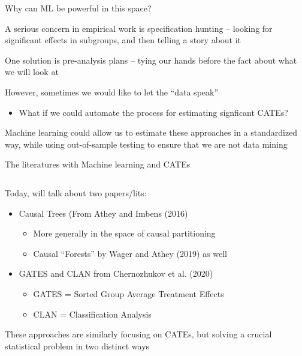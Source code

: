 \documentclass[notes,11pt, aspectratio=169]{beamer}
\newenvironment{wideitemize}{\itemize\addtolength{\itemsep}{10pt}}{\enditemize}
\begin{document}
\begin{frame}{Why can ML be powerful in this space?}
  \begin{wideitemize}
  \item A serious concern in empirical work is specification hunting
    -- looking for significant effects in subgroups, and then telling
    a story about it
  \item One solution is pre-analysis plans -- tying our hands before
    the fact about what we will look at
  \item However, sometimes we would like to let the ``data speak''
    \begin{itemize}
    \item What if we could automate the process for estimating signficant CATEs?
    \end{itemize}
  \item Machine learning could allow us to estimate these approaches
    in a standardized way, while using out-of-sample testing to ensure
    that we are not data mining
  \end{wideitemize}
\end{frame}

\begin{frame}{The literatures with Machine learning and CATEs}
    \begin{columns}[onlytextwidth, T] %
      \begin{column}{.9\textwidth}
        \begin{wideitemize}
        \item Today, will talk about two papers/lits:
          \begin{itemize}
          \item  Causal Trees (From Athey and Imbens (2016)
            \begin{itemize}
            \item More generally in the space of causal partitioning
            \item Causal ``Forests'' by Wager and Athey (2019) as well  
            \end{itemize}
          \item  GATES and CLAN from Chernozhukov et al. (2020)
            \begin{itemize}
            \item GATES = Sorted Group Average Treatment Effects
            \item CLAN = Classification Analysis
            \end{itemize}
          \end{itemize}
        \item These approaches are similarly focusing on CATEs, but
          solving a crucial statistical problem in two distinct ways
        \end{wideitemize}
      \end{column}%
      \hfill%
      \begin{column}{.5\textwidth}
      \end{column}%
    \end{columns}
\end{frame}
\end{document}
